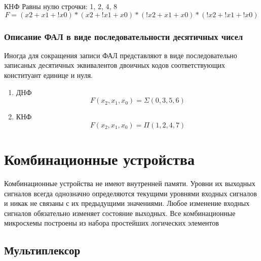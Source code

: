 \documentclass[a4paper]{article}
\begin{document}


КНФ
Равны нулю строчки: 1, 2, 4, 8
$$ F = (x2+x1+!x0)*(x2+!x1+x0)*(!x2+x1+x0)*(!x2+!x1+!x0)$$



\subsubsection{Описание ФАЛ в виде последовательности десятичных чисел}
Иногда для сокращения записи ФАЛ представляют в виде последовательно записаных десятичных эквивалентов двоичных кодов соответствующих конституант единице и нуля.

\begin{enumerate}
\item ДНФ
$$ F(x_2, x_1, x_0) = \Sigma(0, 3, 5, 6) $$
\item КНФ
$$ F(x_2, x_1, x_0) = \Pi(1, 2, 4, 7) $$
\end{enumerate}

\section{Комбинационные устройства}
Комбинационные устройства не имеют внутренней памяти.
Уровни их выходных сигналов всегда однозначно определяются текущими уровнями входных сигналов и никак не связаны с их предыдущими значениями.
Любое изменение входных сигналов обязательно изменяет состояние выходных.
Все комбинационные микросхемы построены из набора простейших логических элементов
\subsection{Мультиплексор}
\end{document}
